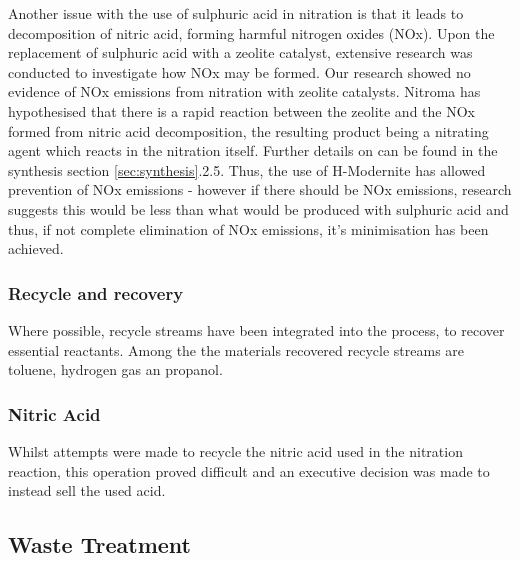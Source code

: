 Another issue with the use of sulphuric acid in nitration is that it leads to decomposition of nitric acid, forming harmful nitrogen oxides (NOx). Upon the replacement of sulphuric acid with a zeolite catalyst, extensive research was conducted to investigate how NOx may be formed. Our research showed no evidence of NOx emissions from nitration with zeolite catalysts. Nitroma has hypothesised that there is a rapid reaction between the zeolite and the NOx formed from nitric acid decomposition, the resulting product being a nitrating agent which reacts in the nitration itself. Further details on can be found in the synthesis section \ref{sec:synthesis}.2.5. Thus, the use of H-Modernite has allowed prevention of NOx emissions - however if there should be NOx emissions, research suggests this would be less than what would be produced with sulphuric acid and thus, if not complete elimination of NOx emissions, it's minimisation has been achieved.  

\subsubsection{Recycle and recovery}

Where possible, recycle streams have been integrated into the process, to recover essential reactants. Among the the materials recovered recycle streams are toluene, hydrogen gas an propanol. 


 

\subsubsection{Nitric Acid}

Whilst attempts were made to recycle the nitric acid used in the nitration reaction, this operation proved difficult and an executive decision was made to instead sell the used acid. 








\subsection{Waste Treatment}


